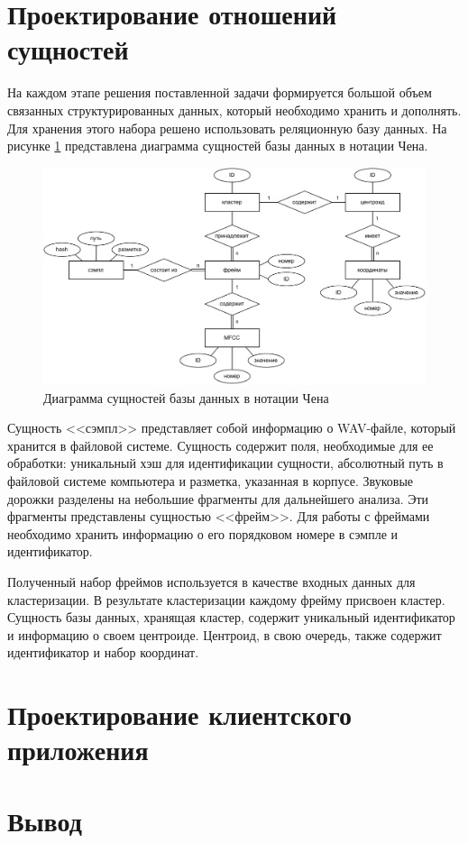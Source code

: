 \section{Проектирование отношений сущностей}
На каждом этапе  решения поставленной задачи формируется большой объем связанных структурированных данных, который необходимо хранить и дополнять. Для хранения этого набора решено использовать реляционную базу данных. На рисунке \ref{fig:chen} представлена диаграмма сущностей базы данных в нотации Чена.
\begin{figure}[H]
	\centering
	\includegraphics[width=\linewidth]{assets/chen}
	\caption{Диаграмма сущностей базы данных в нотации Чена}
	\label{fig:chen}
\end{figure} 
Сущность <<сэмпл>> представляет собой информацию о WAV-файле, который хранится в файловой системе. Сущность содержит поля, необходимые для ее обработки: уникальный хэш для идентификации сущности, абсолютный путь в файловой системе компьютера и разметка, указанная в корпусе. Звуковые дорожки разделены на небольшие фрагменты для дальнейшего анализа. Эти фрагменты представлены сущностью <<фрейм>>. Для работы с фреймами необходимо хранить информацию о его порядковом номере в сэмпле и идентификатор. 

Полученный набор фреймов используется в качестве входных данных для кластеризации. В результате кластеризации каждому фрейму присвоен кластер. Сущность базы данных, хранящая кластер, содержит уникальный идентификатор и информацию о своем центроиде. Центроид, в свою очередь, также содержит идентификатор и набор координат.
\section{Проектирование клиентского приложения}
\section{Вывод}